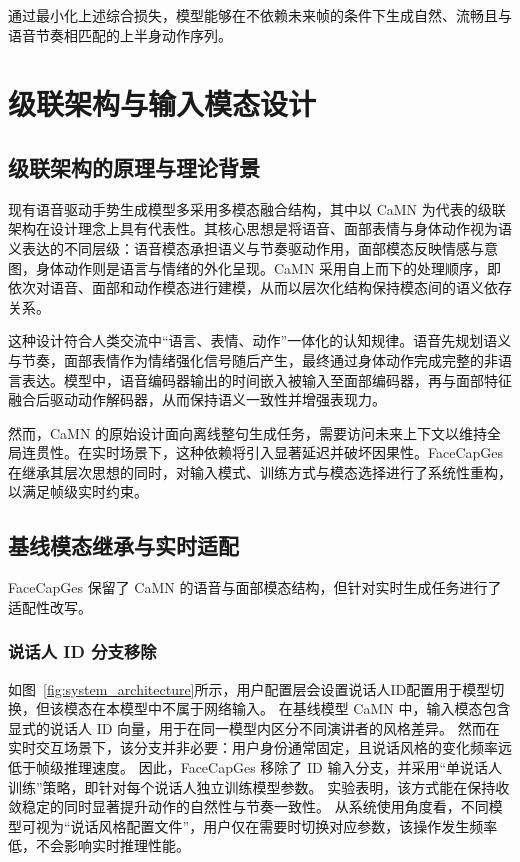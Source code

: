 通过最小化上述综合损失，模型能够在不依赖未来帧的条件下生成自然、流畅且与语音节奏相匹配的上半身动作序列。

\section{级联架构与输入模态设计}
\label{sec:cascade}

\subsection{级联架构的原理与理论背景}

现有语音驱动手势生成模型多采用多模态融合结构，其中以 CaMN \cite{beatcamn} 为代表的级联架构在设计理念上具有代表性。其核心思想是将语音、面部表情与身体动作视为语义表达的不同层级：语音模态承担语义与节奏驱动作用，面部模态反映情感与意图，身体动作则是语言与情绪的外化呈现。CaMN 采用自上而下的处理顺序，即依次对语音、面部和动作模态进行建模，从而以层次化结构保持模态间的语义依存关系。

这种设计符合人类交流中“语言、表情、动作”一体化的认知规律\cite{mcneill_1992_hand, kendon_2004_gesture}。语音先规划语义与节奏，面部表情作为情绪强化信号随后产生，最终通过身体动作完成完整的非语言表达。模型中，语音编码器输出的时间嵌入被输入至面部编码器，再与面部特征融合后驱动动作解码器，从而保持语义一致性并增强表现力。

然而，CaMN 的原始设计面向离线整句生成任务，需要访问未来上下文以维持全局连贯性。在实时场景下，这种依赖将引入显著延迟并破坏因果性。FaceCapGes 在继承其层次思想的同时，对输入模式、训练方式与模态选择进行了系统性重构，以满足帧级实时约束。

\subsection{基线模态继承与实时适配}
FaceCapGes 保留了 CaMN 的语音与面部模态结构，但针对实时生成任务进行了适配性改写。

\subsubsection{说话人 ID 分支移除}
如图~\ref{fig:system_architecture}所示，用户配置层会设置说话人ID配置用于模型切换，但该模态在本模型中不属于网络输入。
在基线模型 CaMN 中，输入模态包含显式的说话人 ID 向量，用于在同一模型内区分不同演讲者的风格差异。
然而在实时交互场景下，该分支并非必要：用户身份通常固定，且说话风格的变化频率远低于帧级推理速度。
因此，FaceCapGes 移除了 ID 输入分支，并采用“单说话人训练”策略，即针对每个说话人独立训练模型参数。
实验表明，该方式能在保持收敛稳定的同时显著提升动作的自然性与节奏一致性。
从系统使用角度看，不同模型可视为“说话风格配置文件”，用户仅在需要时切换对应参数，该操作发生频率低，不会影响实时推理性能。

